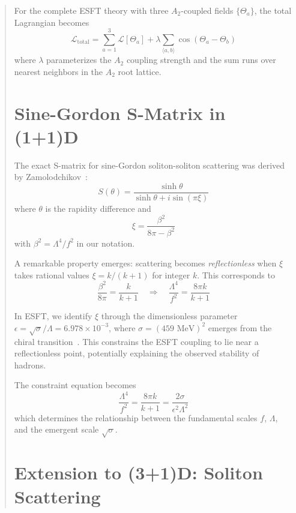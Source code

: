 ﻿\documentclass[twocolumn,prd,amsmath,amssymb,aps]{revtex4-2}
\begin{document}
\begin{abstract}
For the complete ESFT theory with three $A_2$-coupled fields $\{\Theta_a\}$, the total Lagrangian becomes
\begin{equation}
\mathcal{L}_{\text{total}} = \sum_{a=1}^3 \mathcal{L}[\Theta_a] + \lambda \sum_{\langle a,b \rangle} \cos(\Theta_a - \Theta_b)
\label{eq:total_lagrangian}
\end{equation}
where $\lambda$ parameterizes the $A_2$ coupling strength and the sum runs over nearest neighbors in the $A_2$ root lattice.

\section{Sine-Gordon S-Matrix in (1+1)D}

The exact S-matrix for sine-Gordon soliton-soliton scattering was derived by Zamolodchikov~\cite{Zamolodchikov1979}:
\begin{equation}
S(\theta) = \frac{\sinh\theta}{\sinh\theta + i\sin(\pi\xi)}
\label{eq:smatrix}
\end{equation}
where $\theta$ is the rapidity difference and
\begin{equation}
\xi = \frac{\beta^2}{8\pi - \beta^2}
\label{eq:xi_param}
\end{equation}
with $\beta^2 = \Lambda^4/f^2$ in our notation.

A remarkable property emerges: scattering becomes \emph{reflectionless} when $\xi$ takes rational values $\xi = k/(k+1)$ for integer $k$. This corresponds to
\begin{equation}
\frac{\beta^2}{8\pi} = \frac{k}{k+1} \quad \Rightarrow \quad \frac{\Lambda^4}{f^2} = \frac{8\pi k}{k+1}
\label{eq:reflectionless}
\end{equation}

In ESFT, we identify $\xi$ through the dimensionless parameter $\epsilon = \sqrt{\sigma}/\Lambda = 6.978 \times 10^{-3}$, where $\sigma = (459 \text{ MeV})^2$ emerges from the chiral transition~\cite{ESFT7}. This constrains the ESFT coupling to lie near a reflectionless point, potentially explaining the observed stability of hadrons.

The constraint equation becomes
\begin{equation}
\frac{\Lambda^4}{f^2} = \frac{8\pi k}{k+1} = \frac{2\sigma}{\epsilon^2 \Lambda^2}
\end{equation}
which determines the relationship between the fundamental scales $f$, $\Lambda$, and the emergent scale $\sqrt{\sigma}$.

\section{Extension to (3+1)D: Soliton Scattering}


\end{abstract}
\end{document}
